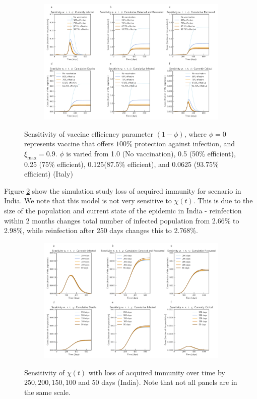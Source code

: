 \documentclass[10pt]{wlscirep}
\begin{document}
\begin{figure}[!htb]
	\centering
	\begin{subfigure}[b]{0.7\textwidth}
		\centering
		\includegraphics[width=1\linewidth]{Italy_scenario_vaccination0.8.pdf}
	\end{subfigure}
	\caption{Sensitivity of vaccine efficiency parameter $(1-\phi)$, where $\phi = 0$ represents vaccine that offers $100\%$ protection against infection, and $\xi_{\max} = 0.9$. $\phi$ is varied from 1.0 (No vaccination), 0.5 (50\% efficient), 0.25 (75\% efficient), 0.125(87.5\% efficient), and 0.0625 (93.75\% efficient) (Italy)}
	\label{fig5B} 
\end{figure}
%
Figure \ref{fig8} show the simulation study loss of acquired immunity for scenario in India. We note that this model is not very sensitive to $\chi(t)$.  This is due to the size of the population and current state of the epidemic in India - reinfection within 2 months changes total number of infected population from 2.66\% to 2.98\%, while reinfection after 250 days changes this to 2.768\%.

%
\begin{figure}[!htb]
	\centering
	\begin{subfigure}[b]{0.7\textwidth}
		\centering
		\includegraphics[width=1\linewidth]{India_scenario_reinfection.pdf}
	\end{subfigure}
	\caption{Sensitivity of $\chi(t)$ with loss of acquired immunity over time by $250, 200, 150, 100$ and $50$ days (India). Note that not all panels are in the same scale.}
	\label{fig8} 
\end{figure}
\end{document}
